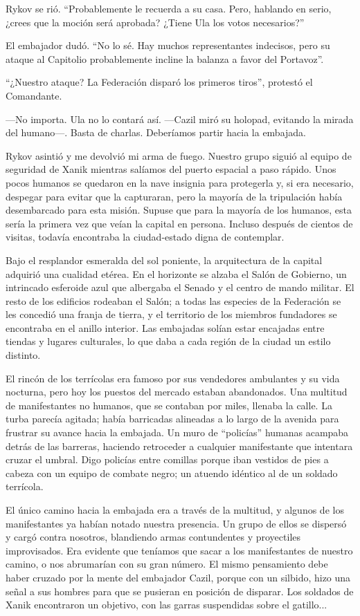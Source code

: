 Rykov se rió. ``Probablemente le recuerda a su casa. Pero, hablando en serio, ¿crees que la moción será aprobada? ¿Tiene Ula los votos necesarios?''

El embajador dudó. ``No lo sé. Hay muchos representantes indecisos, pero su ataque al Capitolio probablemente incline la balanza a favor del Portavoz''.

``¿Nuestro ataque? La Federación disparó los primeros tiros'', protestó el Comandante.

—No importa. Ula no lo contará así. —Cazil miró su holopad, evitando la mirada del humano—. Basta de charlas. Deberíamos partir hacia la embajada.

Rykov asintió y me devolvió mi arma de fuego. Nuestro grupo siguió al equipo de seguridad de Xanik mientras salíamos del puerto espacial a paso rápido. Unos pocos humanos se quedaron en la nave insignia para protegerla y, si era necesario, despegar para evitar que la capturaran, pero la mayoría de la tripulación había desembarcado para esta misión. Supuse que para la mayoría de los humanos, esta sería la primera vez que veían la capital en persona. Incluso después de cientos de visitas, todavía encontraba la ciudad-estado digna de contemplar.

Bajo el resplandor esmeralda del sol poniente, la arquitectura de la capital adquirió una cualidad etérea. En el horizonte se alzaba el Salón de Gobierno, un intrincado esferoide azul que albergaba el Senado y el centro de mando militar. El resto de los edificios rodeaban el Salón; a todas las especies de la Federación se les concedió una franja de tierra, y el territorio de los miembros fundadores se encontraba en el anillo interior. Las embajadas solían estar encajadas entre tiendas y lugares culturales, lo que daba a cada región de la ciudad un estilo distinto.

El rincón de los terrícolas era famoso por sus vendedores ambulantes y su vida nocturna, pero hoy los puestos del mercado estaban abandonados. Una multitud de manifestantes no humanos, que se contaban por miles, llenaba la calle. La turba parecía agitada; había barricadas alineadas a lo largo de la avenida para frustrar su avance hacia la embajada. Un muro de ``policías'' humanas acampaba detrás de las barreras, haciendo retroceder a cualquier manifestante que intentara cruzar el umbral. Digo policías entre comillas porque iban vestidos de pies a cabeza con un equipo de combate negro; un atuendo idéntico al de un soldado terrícola.

El único camino hacia la embajada era a través de la multitud, y algunos de los manifestantes ya habían notado nuestra presencia. Un grupo de ellos se dispersó y cargó contra nosotros, blandiendo armas contundentes y proyectiles improvisados. Era evidente que teníamos que sacar a los manifestantes de nuestro camino, o nos abrumarían con su gran número. El mismo pensamiento debe haber cruzado por la mente del embajador Cazil, porque con un silbido, hizo una señal a sus hombres para que se pusieran en posición de disparar. Los soldados de Xanik encontraron un objetivo, con las garras suspendidas sobre el gatillo...

